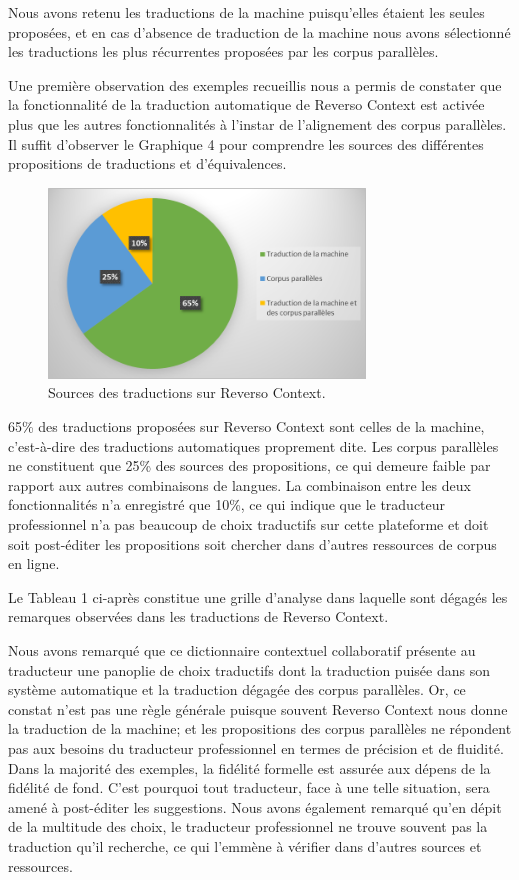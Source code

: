\documentclass[french,english,brazil]{textolivre}
\begin{document}
Nous avons retenu les traductions de la machine puisqu’elles étaient les seules proposées, et en cas d’absence de traduction de la machine nous avons sélectionné les traductions les plus récurrentes proposées par les corpus parallèles.

Une première observation des exemples recueillis nous a permis de constater que la fonctionnalité de la traduction automatique de Reverso Context est activée plus que les autres fonctionnalités à l’instar de l’alignement des corpus parallèles. Il suffit d’observer le Graphique 4 pour comprendre les sources des différentes propositions de traductions et d’équivalences.

\begin{figure}[htbp]
 \centering
 \includegraphics[width=0.75\textwidth]{figure09.png}
 \caption{Sources des traductions sur Reverso Context.}
 \label{fig-09}
\end{figure}

65\% des traductions proposées sur Reverso Context sont celles de la machine, c’est-à-dire des traductions automatiques proprement dite. Les corpus parallèles ne constituent que 25\% des sources des propositions, ce qui demeure faible par rapport aux autres combinaisons de langues. La combinaison entre les deux fonctionnalités n’a enregistré que 10\%, ce qui indique que le traducteur professionnel n’a pas beaucoup de choix traductifs sur cette plateforme et doit soit post-éditer les propositions soit chercher dans d’autres ressources de corpus en ligne.

Le Tableau 1 ci-après constitue une grille d’analyse dans laquelle sont dégagés les remarques observées dans les traductions de Reverso Context.



Nous avons remarqué que ce dictionnaire contextuel collaboratif présente au traducteur une panoplie de choix traductifs dont la traduction puisée dans son système automatique et la traduction dégagée des corpus parallèles. Or, ce constat n’est pas une règle générale puisque souvent Reverso Context nous donne la traduction de la machine; et les propositions des corpus parallèles ne répondent pas aux besoins du traducteur professionnel en termes de précision et de fluidité.  Dans la majorité des exemples, la fidélité formelle est assurée aux dépens de la fidélité de fond. C’est pourquoi tout traducteur, face à une telle situation, sera amené à post-éditer les suggestions. Nous avons également remarqué qu’en dépit de la multitude des choix, le traducteur professionnel ne trouve souvent pas la traduction qu’il recherche, ce qui l’emmène à vérifier dans d’autres sources et ressources.
\end{document}
